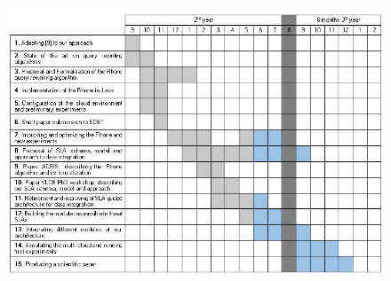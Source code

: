 \documentclass[11pt,a4paper,oneside]{report}
\begin{document}

\begin{figure}[h!]
\center
\includegraphics[scale=0.7]{calendar.png}
\end{figure}
\bigskip
\end{document}
